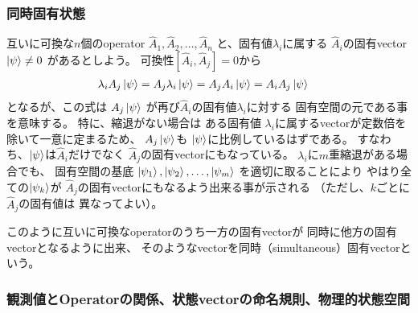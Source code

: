 \subsubsection{同時固有状態}

互いに可換な$n$個のoperator
$\hat{A}_1, \hat{A}_2, \dots, \hat{A}_n$
と、固有値$\lambda_i$に属する
$\hat{A}_i$の固有vector $\ket{\psi} \neq 0$
があるとしよう。
可換性$[\hat{A}_i, \hat{A}_j] = 0$から
\begin{align}
    \lambda_i A_j \ket{\psi}
    &=
    A_j \lambda_i \ket{\psi}
    =
    A_j A_i \ket{\psi}
    =
    A_i A_j \ket{\psi}
\end{align}
となるが、この式は
$A_j \ket{\psi}$
が再び$\hat{A}_i$の固有値$\lambda_i$に対する
固有空間の元である事を意味する。
特に、縮退がない場合は
ある固有値
$\lambda_i$に属するvectorが定数倍を除いて一意に定まるため、
$A_j \ket{\psi}$も
$\ket{\psi}$に比例しているはずである。
すなわち、$\ket{\psi}$は$\hat{A}_i$だけでなく
$\hat{A}_j$の固有vectorにもなっている。
$\lambda_i$に$m$重縮退がある場合でも、
固有空間の基底
$\ket{\psi_1}, \ket{\psi_2}, \dots, \ket{\psi_m}$
を適切に取ることにより
やはり全ての$\ket{\psi_k}$が
$\hat{A}_j$の固有vectorにもなるよう出来る事が示される
（ただし、$k$ごとに$\hat{A}_j$の固有値は
異なってよい）。

このように互いに可換なoperatorのうち一方の固有vectorが
同時に他方の固有vectorとなるように出来、
そのようなvectorを同時（simultaneous）固有vectorという。

\subsubsection{観測値とOperatorの関係、状態vectorの命名規則、物理的状態空間}

